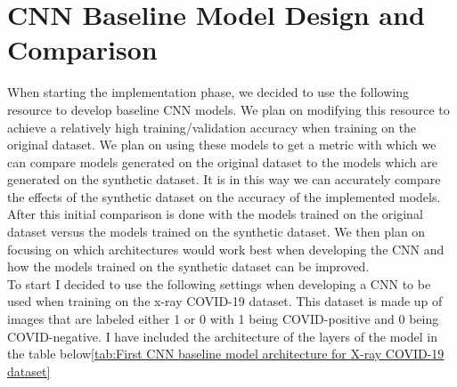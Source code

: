 \section{CNN Baseline Model Design and Comparison}
When starting the implementation phase, we decided to use the following resource to develop baseline CNN models\cite{imageClassificationKeras}.  We plan on modifying this resource to achieve a relatively high training/validation accuracy when training on the original dataset.  We plan on using these models to get a metric with which we can compare models generated on the original dataset to the models which are generated on the synthetic dataset.  It is in this way we can accurately compare the effects of the synthetic dataset on the accuracy of the implemented models.
\\
After this initial comparison is done with the models trained on the original dataset versus the models trained on the synthetic dataset.  We then plan on focusing on which architectures would work best when developing the CNN and how the models trained on the synthetic dataset can be improved.
\\
To start I decided to use the following settings when developing a CNN to be used when training on the x-ray COVID-19 dataset.  This dataset is made up of images that are labeled either 1 or 0 with 1 being COVID-positive and 0 being COVID-negative.  I have included the architecture of the layers of the model in the table below\ref{tab:First CNN baseline model architecture for X-ray COVID-19 dataset}
\begin{table}[H]
    \centering
    \caption{First CNN baseline model architecture for X-ray COVID-19 dataset}
    \label{tab:First CNN baseline model architecture for X-ray COVID-19 dataset}
\end{table}
